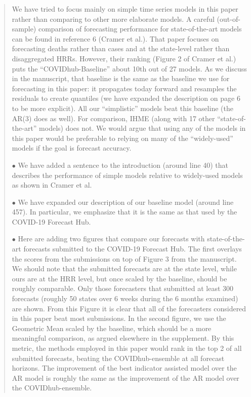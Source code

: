\documentclass[11pt]{article}
\newenvironment{resp}{\begin{quote}\color{cobalt}}{\end{quote}}
\begin{document}
\begin{resp}
  We have tried to focus mainly on simple time series models in this paper
  rather than comparing to other more elaborate models. A careful
  (out-of-sample) comparison of forecasting performance for state-of-the-art
  models can be found in reference 6 (Cramer et al.). That paper focuses on
  forecasting deaths rather than cases and at the state-level rather than
  disaggregated HRRs. However, their ranking (Figure 2 of Cramer et al.) puts the
  ``COVIDhub-Baseline'' about 10th out of 27 models. As we discuss in the
  manuscript, that baseline is  
  the
  same as the baseline we use for forecasting in this paper: it propagates today
  forward and resamples the residuals to create quantiles (we have expanded the
  description on page 6 to be more explicit). All our ``simplistic'' models beat
  this baseline (the AR(3) does as well). For comparison, IHME (along with 17 other
  ``state-of-the-art'' models) does not. We would argue that using any of the
  models in this paper would be preferable to relying on many of the
  ``widely-used'' models if the goal is forecast accuracy.

  $\bullet$ We have added a sentence to the introduction (around line 40) that
  describes the performance of simple models relative to widely-used models as
  shown in Cramer et al.

  $\bullet$ We have expanded our description of our baseline model (around line
  457). In particular, we emphasize that it is the same as that used by the
  COVID-19 Forecast Hub.

  $\bullet$ Here are adding two figures
    that compare our forecasts with state-of-the-art forecasts
  submitted to the COVID-19 Forecast Hub. The first overlays the
  scores from the submissions on top of Figure 3 from the manuscript. We should
  note that the submitted forecasts are at the state level, while ours are at
  the HRR level, but once scaled by the baseline, should be roughly comparable.
  Only those forecasters that submitted at least 300 forecasts (roughly 50
  states over 6 weeks during the 6 months examined) are shown. From this Figure
  it is clear that all of the forecasters considered in this paper beat most
  submissions. In the second figure, we use the Geometric Mean scaled by the
  baseline, which should be a more meaningful comparison, as argued elsewhere in
  the supplement. By this metric, the methods employed in this
  paper would rank in the top 2 of all submitted forecasts, beating the
  COVIDhub-ensemble at all forecast 
  horizons. The improvement of the best indicator assisted model over the AR model
  is roughly the same as the improvement of the AR model over the
  COVIDhub-ensemble.


\end{resp}
\end{document}
